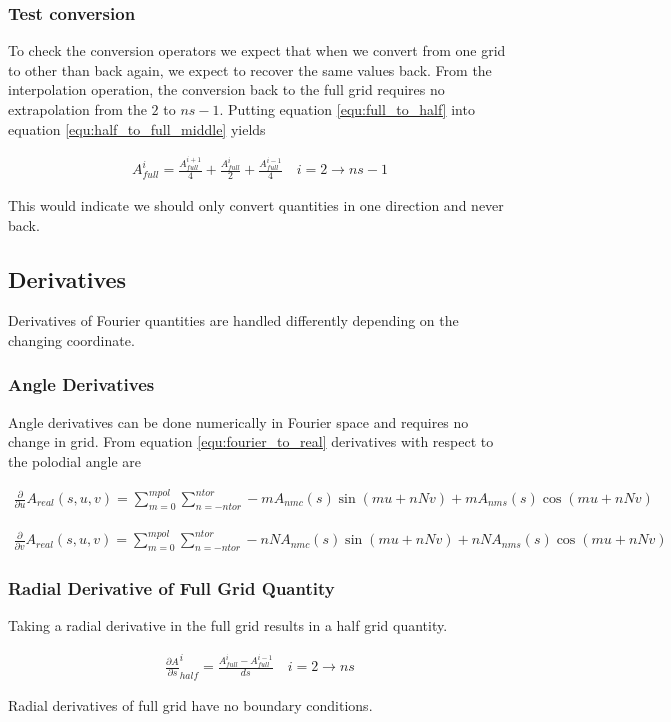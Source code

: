 \documentclass[11pt]{article}
\newcommand{\brackets}[1]{\left(#1\right)}
\newcommand{\equ}[2]{
	\begin{equation}
    \begin{split}
	#1
	\label{#2}
	\end{split}
	\end{equation}
}
\begin{document}
\subsubsection{Test conversion}
To check the conversion operators we expect that when we convert from one grid to other than back again, we expect to recover the same values back.
From the interpolation operation, the conversion back to the full grid requires no extrapolation from the $2$ to $ns-1$.
Putting equation \ref{equ:full_to_half} into equation \ref{equ:half_to_full_middle} yields
\equ{
A^{i}_{full}=\frac{A^{i+1}_{full}}{4}+\frac{A^{i}_{full}}{2}+\frac{A^{i-1}_{full}}{4}\quad i=2\rightarrow ns-1
}{equ:full_to_half_to_full_1}
This would indicate we should only convert quantities in one direction and never back.

\subsection{Derivatives}
Derivatives of Fourier quantities are handled differently depending on the changing coordinate.

\subsubsection{Angle Derivatives}
Angle derivatives can be done numerically in Fourier space and requires no change in grid.
From equation \ref{equ:fourier_to_real} derivatives with respect to the polodial angle are
\equ{
\frac{\partial}{\partial u}A_{real}\brackets{s,u,v}=\sum^{mpol}_{m=0}\sum^{ntor}_{n=-ntor} -mA_{nmc}\brackets{s}\sin\brackets{mu+nNv} + mA_{nms}\brackets{s}\cos\brackets{mu+nNv}
}{equ:fourier_du}
\equ{
\frac{\partial}{\partial v}A_{real}\brackets{s,u,v}=\sum^{mpol}_{m=0}\sum^{ntor}_{n=-ntor} -nNA_{nmc}\brackets{s}\sin\brackets{mu+nNv} + nNA_{nms}\brackets{s}\cos\brackets{mu+nNv}
}{equ:fourier_dv}

\subsubsection{Radial Derivative of Full Grid Quantity}
Taking a radial derivative in the full grid results in a half grid quantity.
\equ{
\frac{\partial A}{\partial s}^{i}_{half}=\frac{A^{i}_{full}-A^{i-1}_{full}}{ds}\quad i=2\rightarrow ns
}{equ:full_ds}
Radial derivatives of full grid have no boundary conditions.
\end{document}
